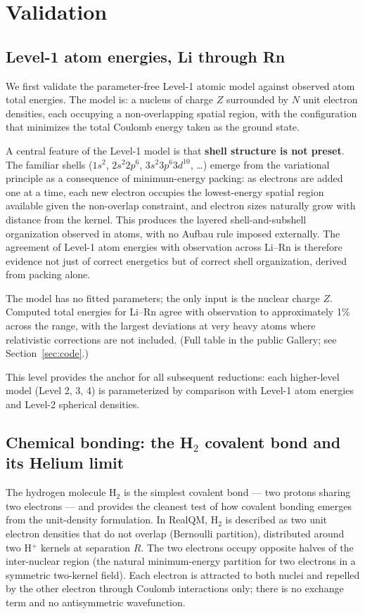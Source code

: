 \documentclass[11pt]{article}
\begin{document}
\section{Validation}\label{sec:validation}

\subsection{Level-1 atom energies, Li through Rn}\label{sec:atoms}

We first validate the parameter-free Level-1 atomic model against observed atom total energies. The model is: a nucleus of charge $Z$ surrounded by $N$ unit electron densities, each occupying a non-overlapping spatial region, with the configuration that minimizes the total Coulomb energy taken as the ground state.

A central feature of the Level-1 model is that \textbf{shell structure is not preset}. The familiar shells ($1s^2$, $2s^2 2p^6$, $3s^2 3p^6 3d^{10}$, \ldots) emerge from the variational principle as a consequence of minimum-energy packing: as electrons are added one at a time, each new electron occupies the lowest-energy spatial region available given the non-overlap constraint, and electron sizes naturally grow with distance from the kernel. This produces the layered shell-and-subshell organization observed in atoms, with no Aufbau rule imposed externally. The agreement of Level-1 atom energies with observation across Li--Rn is therefore evidence not just of correct energetics but of correct shell organization, derived from packing alone.

The model has no fitted parameters; the only input is the nuclear charge $Z$. Computed total energies for Li--Rn agree with observation to approximately 1\% across the range, with the largest deviations at very heavy atoms where relativistic corrections are not included. (Full table in the public Gallery; see Section~\ref{sec:code}.)

This level provides the anchor for all subsequent reductions: each higher-level model (Level 2, 3, 4) is parameterized by comparison with Level-1 atom energies and Level-2 spherical densities.

\subsection{Chemical bonding: the H$_2$ covalent bond and its Helium limit}\label{sec:h2bond}

The hydrogen molecule H$_2$ is the simplest covalent bond --- two protons sharing two electrons --- and provides the cleanest test of how covalent bonding emerges from the unit-density formulation. In RealQM, H$_2$ is described as two unit electron densities that do not overlap (Bernoulli partition), distributed around two H$^+$ kernels at separation $R$. The two electrons occupy opposite halves of the inter-nuclear region (the natural minimum-energy partition for two electrons in a symmetric two-kernel field). Each electron is attracted to both nuclei and repelled by the other electron through Coulomb interactions only; there is no exchange term and no antisymmetric wavefunction.
\end{document}

